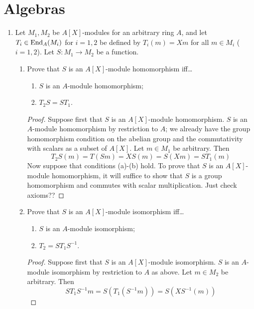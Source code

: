 \documentclass[../psets.tex]{subfiles}
\begin{document}
\section{Algebras}
\begin{enumerate}
    \item {}Let $M_1,M_2$ be $A[X]$-modules for an arbitrary ring $A$, and let $T_i\in\operatorname{End}_A(M_i)$ for $i=1,2$ be defined by $T_i(m)=Xm$ for all $m\in M_i$ ($i=1,2$). Let $S:M_1\to M_2$ be a function.
    \begin{enumerate}
        \item Prove that $S$ is an $A[X]$-module homomorphism iff\dots
        \begin{enumerate}[label={(\alph*)}]
            \item $S$ is an $A$-module homomorphism;
            \item $T_2S=ST_1$.
        \end{enumerate}
        \begin{proof}
            Suppose first that $S$ is an $A[X]$-module homomorphism. $S$ is an $A$-module homomorphism by restriction to $A$; we already have the group homomorphism condition on the abelian group and the commutativity with scalars as a subset of $A[X]$. Let $m\in M_1$ be arbitrary. Then
            \begin{equation*}
                T_2S(m) = T(Sm) = XS(m) = S(Xm) = ST_1(m)
            \end{equation*}
            Now suppose that conditions (a)-(b) hold. To prove that $S$ is an $A[X]$-module homomorphism, it will suffice to show that $S$ is a group homomorphism and commutes with scalar multiplication. Just check axioms??
        \end{proof}
        \item Prove that $S$ is an $A[X]$-module isomorphism iff\dots
        \begin{enumerate}[label={(\alph*)}]
            \item $S$ is an $A$-module isomorphism;
            \item $T_2=ST_1S^{-1}$.
        \end{enumerate}
        \begin{proof}
            Suppose first that $S$ is an $A[X]$-module isomorphism. $S$ is an $A$-module isomorphism by restriction to $A$ as above. Let $m\in M_2$ be arbitrary. Then
            \begin{equation*}
                ST_1S^{-1}m = S(T_1(S^{-1}m))
                = S(XS^{-1}(m))

\end{equation*}
\end{proof}
\end{enumerate}
\end{enumerate}
\end{document}
